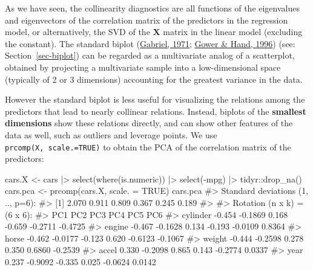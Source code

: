 \documentclass[
  letterpaper,
  10pt,
  krantz2]{krantz}
\makeatletter
\newenvironment{Shaded}{\begin{snugshade}}{\end{snugshade}}
\newcommand{\AttributeTok}[1]{\textcolor[rgb]{0.40,0.45,0.13}{#1}}
\newcommand{\CommentTok}[1]{\textcolor[rgb]{0.37,0.37,0.37}{#1}}
\newcommand{\ConstantTok}[1]{\textcolor[rgb]{0.56,0.35,0.01}{#1}}
\newcommand{\FunctionTok}[1]{\textcolor[rgb]{0.28,0.35,0.67}{#1}}
\newcommand{\NormalTok}[1]{\textcolor[rgb]{0.00,0.23,0.31}{#1}}
\newcommand{\OtherTok}[1]{\textcolor[rgb]{0.00,0.23,0.31}{#1}}
\newcommand{\SpecialCharTok}[1]{\textcolor[rgb]{0.37,0.37,0.37}{#1}}
\newenvironment{kframe}{%
  \medskip{}
  \setlength{\fboxsep}{.8em}
  \def\at@end@of@kframe{}%
  \ifinner\ifhmode%
  \def\at@end@of@kframe{\end{minipage}}%
  \begin{minipage}{\columnwidth}%
  \fi\fi%
  \def\FrameCommand##1{\hskip\@totalleftmargin \hskip-\fboxsep
  \colorbox{shadecolor}{##1}\hskip-\fboxsep
      \hskip-\linewidth \hskip-\@totalleftmargin \hskip\columnwidth}%
  \MakeFramed {\advance\hsize-\width
    \@totalleftmargin\z@ \linewidth\hsize
    \@setminipage}}%
{\par\unskip\endMakeFramed%
  \at@end@of@kframe}
\renewenvironment{Shaded}{\begin{kframe}}{\end{kframe}}
\makeatother
\begin{document}
As we have seen, the collinearity diagnostics are all functions of the
eigenvalues and eigenvectors of the correlation matrix of the predictors
in the regression model, or alternatively, the SVD of the \(\mathbf{X}\)
matrix in the linear model (excluding the constant). The standard biplot
(\protect\hyperlink{ref-Gabriel:71}{Gabriel, 1971};
\protect\hyperlink{ref-GowerHand:96}{Gower \& Hand, 1996}) (see:
Section~\ref{sec-biplot}) can be regarded as a multivariate analog of a
scatterplot, obtained by projecting a multivariate sample into a
low-dimensional space (typically of 2 or 3 dimensions) accounting for
the greatest variance in the data.

However the standard biplot is less useful for visualizing the relations
among the predictors that lead to nearly collinear relations. Instead,
biplots of the \textbf{smallest dimensions} show these relations
directly, and can show other features of the data as well, such as
outliers and leverage points. We use \texttt{prcomp(X,\ scale.=TRUE)} to
obtain the PCA of the correlation matrix of the predictors:

\begin{Shaded}
\begin{Highlighting}[]
\NormalTok{cars.X }\OtherTok{\textless{}{-}}\NormalTok{ cars }\SpecialCharTok{|\textgreater{}}
  \FunctionTok{select}\NormalTok{(}\FunctionTok{where}\NormalTok{(is.numeric)) }\SpecialCharTok{|\textgreater{}}
  \FunctionTok{select}\NormalTok{(}\SpecialCharTok{{-}}\NormalTok{mpg) }\SpecialCharTok{|\textgreater{}}
\NormalTok{  tidyr}\SpecialCharTok{::}\FunctionTok{drop\_na}\NormalTok{()}
\NormalTok{cars.pca }\OtherTok{\textless{}{-}} \FunctionTok{prcomp}\NormalTok{(cars.X, }\AttributeTok{scale. =} \ConstantTok{TRUE}\NormalTok{)}
\NormalTok{cars.pca}
\CommentTok{\#\textgreater{} Standard deviations (1, .., p=6):}
\CommentTok{\#\textgreater{} [1] 2.070 0.911 0.809 0.367 0.245 0.189}
\CommentTok{\#\textgreater{} }
\CommentTok{\#\textgreater{} Rotation (n x k) = (6 x 6):}
\CommentTok{\#\textgreater{}             PC1     PC2    PC3    PC4     PC5     PC6}
\CommentTok{\#\textgreater{} cylinder {-}0.454 {-}0.1869  0.168 {-}0.659 {-}0.2711 {-}0.4725}
\CommentTok{\#\textgreater{} engine   {-}0.467 {-}0.1628  0.134 {-}0.193 {-}0.0109  0.8364}
\CommentTok{\#\textgreater{} horse    {-}0.462 {-}0.0177 {-}0.123  0.620 {-}0.6123 {-}0.1067}
\CommentTok{\#\textgreater{} weight   {-}0.444 {-}0.2598  0.278  0.350  0.6860 {-}0.2539}
\CommentTok{\#\textgreater{} accel     0.330 {-}0.2098  0.865  0.143 {-}0.2774  0.0337}
\CommentTok{\#\textgreater{} year      0.237 {-}0.9092 {-}0.335  0.025 {-}0.0624  0.0142}
\end{Highlighting}
\end{Shaded}
\end{document}
